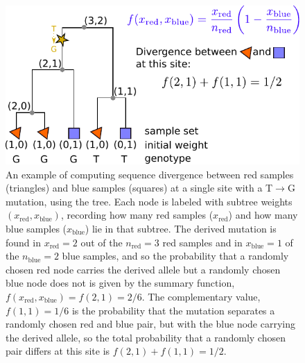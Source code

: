 \documentclass[9pt,twoside,lineno]{gsajnl}
\begin{document}
\begin{figure}
    \begin{center}
    \includegraphics{figures/divergence_diagram_simple}
    \end{center}
    \caption{
        An example of computing sequence divergence
        between red samples (triangles) and blue samples (squares)
        at a single site with a T$\to$G mutation, using the tree.
        Each node is labeled with subtree weights $(x_\text{red},x_\text{blue})$,
        recording how many red samples ($x_\text{red}$)
        and how many blue samples ($x_\text{blue}$) lie in that subtree.
        The derived mutation is found in $x_\text{red}=2$ out of the $n_\text{red} = 3$ red samples
        and in $x_\text{blue}=1$ of the $n_\text{blue}=2$ blue samples, and so the probability that a randomly chosen red node carries the derived allele
        but a randomly chosen blue node does not
        is given by the summary function, $f(x_\text{red}, x_\text{blue}) = f(2, 1) = 2/6$.
        The complementary value, $f(1, 1) = 1/6$ is the probability that the mutation separates
        a randomly chosen red and blue pair, but with the blue node carrying the derived allele,
        so the total probability that a randomly chosen pair
        differs at this site is $f(2,1) + f(1,1) = 1/2$.
        \label{fig:divergence_diagram}
    }
\end{figure}
\end{document}
